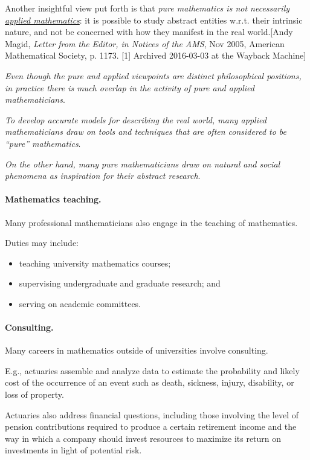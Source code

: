\documentclass{article}
\begin{document}
%
Another insightful view put forth is that \textit{pure mathematics is not necessarily \href{https://en.wikipedia.org/wiki/Applied_mathematics}{applied mathematics}}: it is possible to study abstract entities w.r.t. their intrinsic nature, and not be concerned with how they manifest in the real world.[Andy Magid, \textit{Letter from the Editor, in Notices of the AMS}, Nov 2005, American Mathematical Society, p. 1173. [1] Archived 2016-03-03 at the Wayback Machine]

\textit{Even though the pure and applied viewpoints are distinct philosophical positions, in practice there is much overlap in the activity of pure and applied mathematicians}.

%
\textit{To develop accurate models for describing the real world, many applied mathematicians draw on tools and techniques that are often considered to be ``pure'' mathematics}.

\textit{On the other hand, many pure mathematicians draw on natural and social phenomena as inspiration for their abstract research}.

\paragraph{Mathematics teaching.} Many professional mathematicians also engage in the teaching of mathematics.

Duties may include:
\begin{itemize}
	\item teaching university mathematics courses;
	\item supervising undergraduate and graduate research; and
	\item serving on academic committees.
\end{itemize}

\paragraph{Consulting.} Many careers in mathematics outside of universities involve consulting.

E.g., actuaries assemble and analyze data to estimate the probability and likely cost of the occurrence of an event such as death, sickness, injury, disability, or loss of property.

Actuaries also address financial questions, including those involving the level of pension contributions required to produce a certain retirement income and the way in which a company should invest resources to maximize its return on investments in light of potential risk.
\end{document}

